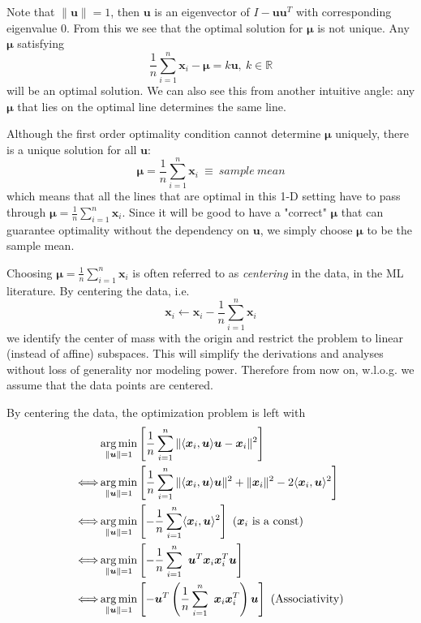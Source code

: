 \documentclass[../book-template.tex]{subfiles}
\begin{document}
Note that $\|\bm{u}\|=1$, then $\bm{u}$ is an eigenvector of $I-\bm{u}\bm{u}^T $ with corresponding eigenvalue $0$. From this we see that the optimal solution for $\bm{\mu}$ is not unique. Any $\bm{\mu}$ satisfying 
\begin{equation*}
    \frac{1}{n}\sum_{i=1}^n\bm{x}_i-\bm{\mu} = k\bm{u},\ k\in \mathbb{R}
\end{equation*}
will be an optimal solution. We can also see this from another intuitive angle: any $\bm{\mu}$ that lies on the optimal line determines the same line.
\par Although the first order optimality condition cannot determine $\bm{\mu}$ uniquely, there is a unique solution for all $\bm{u}$:
\begin{equation*}
    \bm{\mu} = \frac{1}{n}\sum_{i=1}^n\bm{x}_i ~\equiv~ sample\ mean
\end{equation*}
which means that all the lines that are optimal in this 1-D setting have to pass through $ \bm{\mu} = \frac{1}{n}\sum_{i=1}^n\bm{x}_i$. Since it will be good to have a "correct" $\bm{\mu}$ that can guarantee optimality without the dependency on $\bm{u}$, we simply choose $\bm{\mu}$ to be the sample mean.
\par Choosing $\bm{\mu} = \frac{1}{n}\sum_{i=1}^n\bm{x}_i$ is often referred to as \emph{centering} in the data, in the ML literature. By centering the data, i.e.
\begin{equation*}
    \bm{x}_i\leftarrow \bm{x}_i-\frac{1}{n}\sum_{i=1}^n\bm{x}_i
\end{equation*}
we identify the center of mass with the origin and restrict the problem to linear (instead of affine) subspaces. This will simplify the derivations and analyses without loss of generality nor modeling power. Therefore from now on, w.l.o.g. we assume that the data points are centered.
\par By centering the data, the optimization problem is left with
\begin{align}
    &\mathop{\arg\min}_{\|\bm{u}\|=1} \left[ \frac{1}{n}\sum_{i=1}^n \|\langle \bm{x}_i,\bm{u}\rangle \bm{u} - \bm{x}_i\|^2 \right]\notag\\
    \Longleftrightarrow &\mathop{\arg\min}_{\|\bm{u}\|=1} \left[ \frac{1}{n}\sum_{i=1}^n \|\langle \bm{x}_i,\bm{u}\rangle \bm{u}\|^2 + \|\bm{x}_i\|^2 - 2\langle \bm{x}_i,\bm{u}\rangle^2 \right]\notag\\
    \Longleftrightarrow &\mathop{\arg\min}_{\|\bm{u}\|=1} \left[- \frac{1}{n}\sum_{i=1}^n\langle \bm{x}_i,\bm{u}\rangle^2 \right]\ (\bm{x}_i\text{ is a const})\notag\\
    \Longleftrightarrow &\mathop{\arg\min}_{\|\bm{u}\|=1} \left[- \frac{1}{n}\sum_{i=1}^n\ \bm{u}^T\bm{x}_i\bm{x}_i^T\bm{u} \right]\notag\\
    \label{eq_2_obj_u}\Longleftrightarrow &\mathop{\arg\min}_{\|\bm{u}\|=1} \left[- \bm{u}^T\left(\frac{1}{n}\sum_{i=1}^n\ \bm{x}_i\bm{x}_i^T\right)\bm{u} \right]\ (\text{Associativity})
\end{align}
\end{document}
